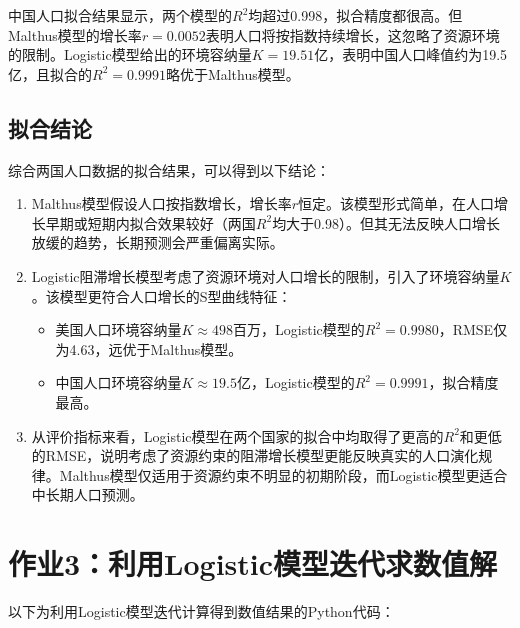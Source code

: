\documentclass{article}
\begin{document}
	中国人口拟合结果显示，两个模型的\(R^2\)均超过0.998，拟合精度都很高。但Malthus模型的增长率\(r=0.0052\)表明人口将按指数持续增长，这忽略了资源环境的限制。Logistic模型给出的环境容纳量\(K=19.51\)亿，表明中国人口峰值约为19.5亿，且拟合的\(R^2=0.9991\)略优于Malthus模型。
	
	\subsection{拟合结论}
	
	综合两国人口数据的拟合结果，可以得到以下结论：
	
	\begin{enumerate}
		\item Malthus模型假设人口按指数增长，增长率\(r\)恒定。该模型形式简单，在人口增长早期或短期内拟合效果较好（两国\(R^2\)均大于0.98）。但其无法反映人口增长放缓的趋势，长期预测会严重偏离实际。
		
		\item Logistic阻滞增长模型考虑了资源环境对人口增长的限制，引入了环境容纳量\(K\)。该模型更符合人口增长的S型曲线特征：
		\begin{itemize}
			\item 美国人口环境容纳量\(K\approx 498\)百万，Logistic模型的\(R^2=0.9980\)，RMSE仅为4.63，远优于Malthus模型。
			\item 中国人口环境容纳量\(K\approx 19.5\)亿，Logistic模型的\(R^2=0.9991\)，拟合精度最高。
		\end{itemize}
		
		\item 从评价指标来看，Logistic模型在两个国家的拟合中均取得了更高的\(R^2\)和更低的RMSE，说明考虑了资源约束的阻滞增长模型更能反映真实的人口演化规律。Malthus模型仅适用于资源约束不明显的初期阶段，而Logistic模型更适合中长期人口预测。
	\end{enumerate}
	
	\section{作业3：利用Logistic模型迭代求数值解}
	
	以下为利用Logistic模型迭代计算得到数值结果的Python代码：
	
\end{document}
